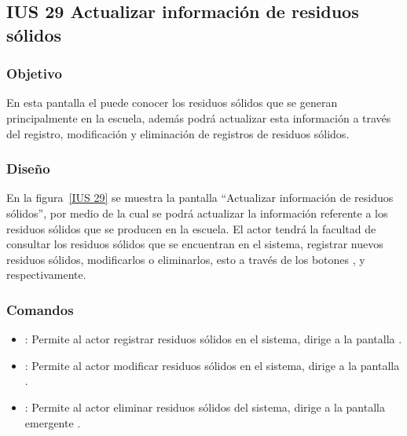 \subsection{IUS 29 Actualizar información de residuos sólidos}

\subsubsection{Objetivo}

    En esta pantalla el  puede conocer los residuos sólidos que se generan principalmente en la escuela, además podrá actualizar esta información a través del registro, modificación y eliminación de registros de residuos sólidos.

\subsubsection{Diseño}

    En la figura~\ref{IUS 29} se muestra la pantalla ``Actualizar información de residuos sólidos'', por medio de la cual se podrá actualizar la información referente a los residuos sólidos que se producen en la escuela. El actor tendrá la facultad de consultar los residuos sólidos que se encuentran en el sistema, registrar nuevos residuos sólidos, modificarlos o eliminarlos, esto a través de los botones , \botEdit y \botKo respectivamente.\\
    


\subsubsection{Comandos}
    \begin{itemize}
	\item {}: Permite al actor registrar residuos sólidos en el sistema, dirige a la pantalla .
	
	\item \botEdit [Modificar]: Permite al actor modificar residuos sólidos en el sistema, dirige a la pantalla .
	
	\item \botKo [Eliminar]: Permite al actor eliminar residuos sólidos del sistema, dirige a la pantalla emergente .
	
    \end{itemize}

